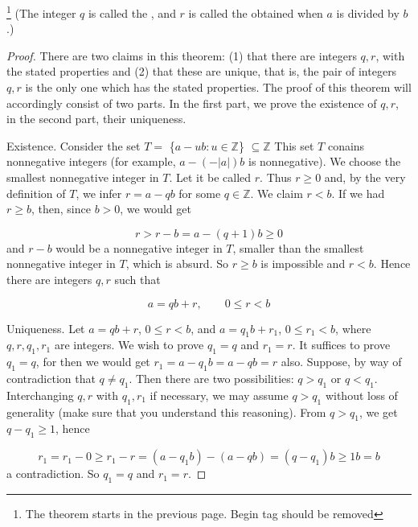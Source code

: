 \documentclass[11pt]{amsbook}
\begin{document}


\begin{thm} \footnote{The theorem starts in the previous page. Begin tag should be removed}
	(The integer $q$ is called the , and $r$ is called 
	the  obtained when $a$ is divided by $b$.)
\end{thm}

\begin{proof}
	There are two claims in this theorem: (1) that there are integers
	$q,r$, with the stated properties and (2) that these are unique, that is, 
	the pair of integers $q,r$ is the only one which has the stated properties.
	The proof of this theorem will accordingly consist of two parts. In the first
	part, we prove the existence of $q,r$, in the second part, their uniqueness.

	Existence. Consider the set $T =$ \{$a - ub : u \in \mathbb{Z}$\} $\subseteq \mathbb{Z}$
	This set $T$ conains nonnegative integers (for example, $a-(-|a|)b$ is nonnegative).
	We choose the smallest nonnegative integer in $T$. Let it be called $r$. Thus $r \geqslant 0$
	and, by the very definition of $T$, we infer $r = a - qb$ for some $q \in \mathbb{Z}$. 
	We claim $r < b$. If we had $r \geqslant b$, then, since $b>0$, we would get

	\[ r > r-b = a - (q+1)b \geqslant 0\]
	and $r-b$ would be a nonnegative integer in $T$, smaller than the smallest nonnegative integer 
	in $T$, which is absurd. So $r \geqslant b$ is impossible and $r<b$. Hence there are integers
	$q,r$ such that

	\[ a = qb + r, \qquad 0 \leqslant r < b\]

	Uniqueness. Let $a = qb + r$, $0 \leqslant r < b$, and $a = q_1b + r_1$, $0 \leqslant r_1 < b$, 
	where $q,r,q_1,r_1$ are integers. We wish to prove $q_1 = q$ and $r_1 = r$. It suffices to prove
	$q_1 = q$, for then we would get $r_1 = a - q_1b = a - qb = r$ also. Suppose, by way of 
	contradiction that $q \neq q_1$. Then there are two possibilities: $q > q_1$ or $q < q_1$. 
	Interchanging $q,r$ with $q_1,r_1$ if necessary, we may assume $q > q_1$ without loss of 
	generality (make sure that you understand this reasoning). From $q>q_1$, we get 
	$q - q_1 \geqslant 1$, hence

	\[
	 r_1 = r_1 - 0 \geqslant
					r_1 - r = (a - q_1b) - (a - qb) = 
										(q - q_1)b \geqslant 1b = b
	\]
	a contradiction. So $q_1 = q$ and $r_1 = r$.

\end{proof}
\end{document}
